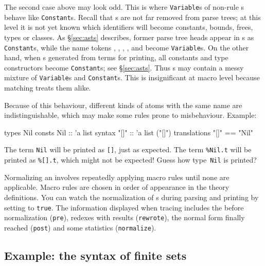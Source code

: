 The second case above may look odd.  This is where {\tt Variable}s of
non-rule \AST{}s behave like {\tt Constant}s.  Recall that \AST{}s are not
far removed from parse trees; at this level it is not yet known which
identifiers will become constants, bounds, frees, types or classes.  As
\S\ref{sec:asts} describes, former parse tree heads appear in \AST{}s as
{\tt Constant}s, while the name tokens , , ,
,  and  become {\tt Variable}s.  On the other
hand, when \AST{}s generated from terms for printing, all constants and type
constructors become {\tt Constant}s; see \S\ref{sec:asts}.  Thus \AST{}s may
contain a messy mixture of {\tt Variable}s and {\tt Constant}s.  This is
insignificant at macro level because matching treats them alike.

Because of this behaviour, different kinds of atoms with the same name are
indistinguishable, which may make some rules prone to misbehaviour.  Example:
\begin{ttbox}
types
  Nil
consts
  Nil     :: 'a list
syntax
  "[]"    :: 'a list    ("[]")
translations
  "[]"    == "Nil"
\end{ttbox}
The term {\tt Nil} will be printed as {\tt []}, just as expected.
The term \verb|%Nil.t| will be printed as \verb|%[].t|, which might not be
expected!  Guess how type~{\tt Nil} is printed?

Normalizing an \AST{} involves repeatedly applying macro rules until none are
applicable.  Macro rules are chosen in order of appearance in the theory
definitions.  You can watch the normalization of \AST{}s during parsing and
printing by setting  to {\tt true}. The information displayed when tracing includes the \AST{} before
normalization ({\tt pre}), redexes with results ({\tt rewrote}), the normal
form finally reached ({\tt post}) and some statistics ({\tt normalize}).

\subsection{Example: the syntax of finite sets}


